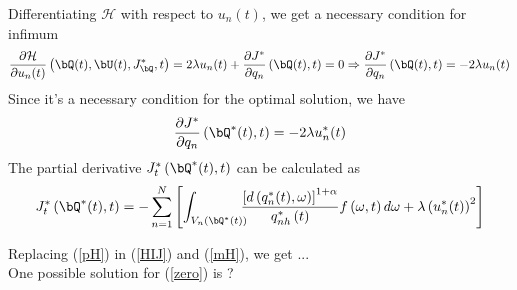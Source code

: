 Differentiating $\mathcal{H}$ with respect to $u_n(t)$, we get a necessary condition for infimum
\begin{equation}
\frac{\partial\mathcal{H}}{\partial u_n(t)}\left(\bQ(t),\bU(t),J^*_{\bQ},t\right)=2\lambda u_n(t)+\frac{\partial J^*}{\partial q_n}\left(\bQ(t), t\right)=0 \Rightarrow \frac{\partial J^*}{\partial q_n}\left(\bQ(t), t\right)=-2\lambda u_n(t)
\label{pH}
\end{equation}
Since it's a necessary condition for the optimal solution, we have
\begin{equation}
\frac{\partial J^*}{\partial q_n}\left(\bQ^*(t), t\right)=-2\lambda u^*_n(t)
\end{equation}
The partial derivative $J^*_{t}\left(\bQ^*(t), t\right)$ can be calculated as
\begin{equation}
J^*_{t}\left(\bQ^*(t), t\right)=-\sum_{n=1}^{N}\left[\int_{V_n\left(\bQ^*(t)\right)}\!\!\!\!\frac{\left[d\left(q^*_n(t),\omega\right)\right]^{1+\alpha}}{q^*_{nh}\left(t\right)}f\left(\omega,t\right)d\omega + \lambda \left(u^*_n(t)\right)^2 \right]
\end{equation}

Replacing (\ref{pH}) in (\ref{HIJ}) and (\ref{mH}), we get ...\\
%
One possible solution for (\ref{zero}) is ?\\
%
\begin{comment}
\begin{equation}
u_n(t) = \sqrt{\frac{\int_{V_n\left(\bQ(t)\right)}\left(\frac{\left[d\left(q_n(t),\omega\right)\right]^{1+\alpha}}{q_{nh}\left(t\right)}\right)f\left(\omega,t\right)d\omega}{\lambda}}
\label{u}
\end{equation}
Replacing (\ref{u}) in (\ref{pH}), we have
\begin{equation}
\frac{\partial J^*}{\partial q_n}\left(\bQ(t), t\right)=-2\sqrt{\lambda\int_{V_n\left(\bQ(t)\right)}\left(\frac{\left[d\left(q_n(t),\omega\right)\right]^{1+\alpha}}{q_{nh}\left(t\right)}\right)f\left(\omega,t\right)d\omega}
\end{equation}
\end{comment}
{\color{red}{To be continued ...}}

